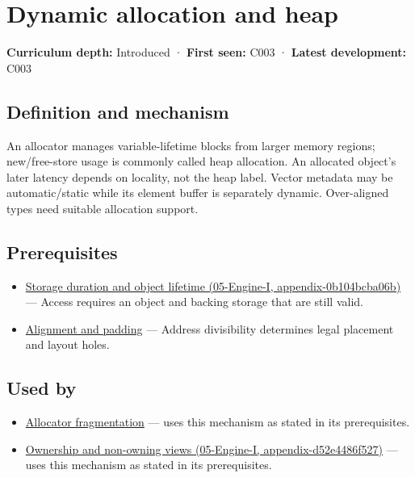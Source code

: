 \hypertarget{appendix-c3480f7d9ff3}{}
\section{Dynamic allocation and heap}\label{appendix-c3480f7d9ff3-dynamic-allocation-and-heap}

\textbf{Curriculum depth:} Introduced · \textbf{First seen:} C003 · \textbf{Latest development:} C003

\subsection{Definition and mechanism}\label{appendix-c3480f7d9ff3-definition-and-mechanism}

An allocator manages variable-lifetime blocks from larger memory regions; new/free-store usage is commonly called heap allocation. An allocated object's later latency depends on locality, not the heap label. Vector metadata may be automatic/static while its element buffer is separately dynamic. Over-aligned types need suitable allocation support.

\subsection{Prerequisites}\label{appendix-c3480f7d9ff3-prerequisites}

\begin{itemize}
\tightlist
\item
  \href{../05-Engine-I/main.pdf\#nameddest=appendix-0b104bcba06b}{Storage duration and object lifetime (05-Engine-I, appendix-0b104bcba06b)} --- Access requires an object and backing storage that are still valid.
\item
  \hyperref[appendix-a1f7c53b4742]{Alignment and padding} --- Address divisibility determines legal placement and layout holes.
\end{itemize}

\subsection{Used by}\label{appendix-c3480f7d9ff3-used-by}

\begin{itemize}
\tightlist
\item
  \hyperref[appendix-a7c50686d81f]{Allocator fragmentation} --- uses this mechanism as stated in its prerequisites.
\item
  \href{../05-Engine-I/main.pdf\#nameddest=appendix-d52e4486f527}{Ownership and non-owning views (05-Engine-I, appendix-d52e4486f527)} --- uses this mechanism as stated in its prerequisites.
\end{itemize}

